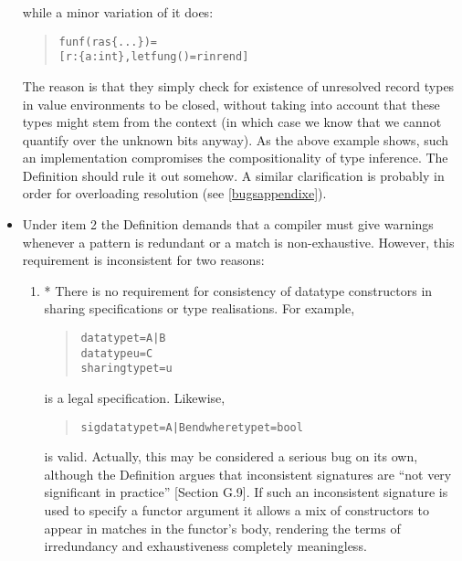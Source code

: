 \documentclass[twoside,titlepage]{article}
\begin{document}
\begin{appendix}
\begin{itemize}
while a minor variation of it does:

\begin{quote}
\begin{alltt}
fun f(r as \{...\}) =
    [r : \{a:int\}, let fun g() = r in r end]
\end{alltt}
\end{quote}

The reason is that they simply check for existence of unresolved record types in value environments to be closed, without taking into account that these types might stem from the context (in which case we know that we cannot quantify over the unknown bits anyway). As the above example shows, such an implementation compromises the compositionality of type inference. The Definition should rule it out somehow. A similar clarification is probably in order for overloading resolution (see \ref{bugsappendixe}).

\item Under item 2 the Definition demands that a compiler must give warnings whenever a pattern is redundant or a match is non-exhaustive. However, this requirement is inconsistent for two reasons:

\begin{enumerate}

\item * There is no requirement for consistency of datatype constructors in sharing specifications or type realisations. For example,

\begin{quote}
\begin{alltt}
datatype t = A | B
datatype u = C
sharing type t = u
\end{alltt}
\end{quote}

is a legal specification.  Likewise,

\begin{quote}
\begin{alltt}
sig datatype t = A | B end where type t = bool
\end{alltt}
\end{quote}

is valid. Actually, this may be considered a serious bug on its own, although the Definition argues that inconsistent signatures are ``not very significant in practice'' [Section G.9]. If such an inconsistent signature is used to specify a functor argument it allows a mix of constructors to appear in matches in the functor's body, rendering the terms of irredundancy and exhaustiveness completely meaningless.


\end{enumerate}
\end{itemize}
\end{appendix}
\end{document}
